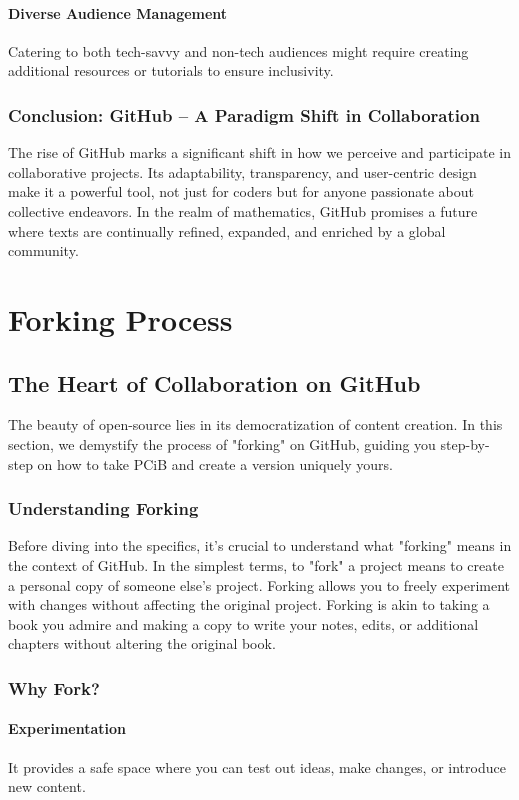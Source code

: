 \documentclass[a4paper,12pt]{book}
\begin{document}
\subsubsection*{Diverse Audience Management}
Catering to both tech-savvy and non-tech audiences might require creating additional resources or tutorials to ensure inclusivity.

\subsection*{Conclusion: GitHub – A Paradigm Shift in Collaboration}
The rise of GitHub marks a significant shift in how we perceive and participate in collaborative projects. Its adaptability, transparency, and user-centric design make it a powerful tool, not just for coders but for anyone passionate about collective endeavors. In the realm of mathematics, GitHub promises a future where texts are continually refined, expanded, and enriched by a global community.

\chapter{Forking Process}
\section*{The Heart of Collaboration on GitHub}
The beauty of open-source lies in its democratization of content creation. In this section, we demystify the process of "forking" on GitHub, guiding you step-by-step on how to take PCiB and create a version uniquely yours.

\subsection*{Understanding Forking}
Before diving into the specifics, it's crucial to understand what "forking" means in the context of GitHub. In the simplest terms, to "fork" a project means to create a personal copy of someone else's project. Forking allows you to freely experiment with changes without affecting the original project. Forking is akin to taking a book you admire and making a copy to write your notes, edits, or additional chapters without altering the original book.

\subsection*{Why Fork?}
\subsubsection*{Experimentation}
It provides a safe space where you can test out ideas, make changes, or introduce new content.
\end{document}
